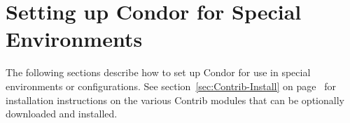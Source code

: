 \section{\label{sec:special-environments}Setting up Condor for Special
Environments} 

The following sections describe how to set up Condor for use in
special environments or configurations.
See section~\ref{sec:Contrib-Install} on
page~\pageref{sec:Contrib-Install} for installation instructions on
the various Contrib modules that can be optionally downloaded and
installed.












